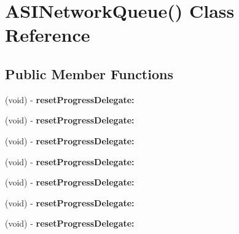 \hypertarget{interface_a_s_i_network_queue_07_08}{
\section{\-A\-S\-I\-Network\-Queue() \-Class \-Reference}
\label{interface_a_s_i_network_queue_07_08}
}
\subsection*{\-Public \-Member \-Functions}
\begin{DoxyCompactItemize}
\item 
\hypertarget{interface_a_s_i_network_queue_07_08_a44ecca8cbb719f930f52221d917bfbaf}{
(void) -\/ {\bfseries reset\-Progress\-Delegate\-:}}
\label{interface_a_s_i_network_queue_07_08_a44ecca8cbb719f930f52221d917bfbaf}

\item 
\hypertarget{interface_a_s_i_network_queue_07_08_a44ecca8cbb719f930f52221d917bfbaf}{
(void) -\/ {\bfseries reset\-Progress\-Delegate\-:}}
\label{interface_a_s_i_network_queue_07_08_a44ecca8cbb719f930f52221d917bfbaf}

\item 
\hypertarget{interface_a_s_i_network_queue_07_08_a44ecca8cbb719f930f52221d917bfbaf}{
(void) -\/ {\bfseries reset\-Progress\-Delegate\-:}}
\label{interface_a_s_i_network_queue_07_08_a44ecca8cbb719f930f52221d917bfbaf}

\item 
\hypertarget{interface_a_s_i_network_queue_07_08_a44ecca8cbb719f930f52221d917bfbaf}{
(void) -\/ {\bfseries reset\-Progress\-Delegate\-:}}
\label{interface_a_s_i_network_queue_07_08_a44ecca8cbb719f930f52221d917bfbaf}

\item 
\hypertarget{interface_a_s_i_network_queue_07_08_a44ecca8cbb719f930f52221d917bfbaf}{
(void) -\/ {\bfseries reset\-Progress\-Delegate\-:}}
\label{interface_a_s_i_network_queue_07_08_a44ecca8cbb719f930f52221d917bfbaf}

\item 
\hypertarget{interface_a_s_i_network_queue_07_08_a44ecca8cbb719f930f52221d917bfbaf}{
(void) -\/ {\bfseries reset\-Progress\-Delegate\-:}}
\label{interface_a_s_i_network_queue_07_08_a44ecca8cbb719f930f52221d917bfbaf}

\item 
\hypertarget{interface_a_s_i_network_queue_07_08_a44ecca8cbb719f930f52221d917bfbaf}{
(void) -\/ {\bfseries reset\-Progress\-Delegate\-:}}
\label{interface_a_s_i_network_queue_07_08_a44ecca8cbb719f930f52221d917bfbaf}


\end{DoxyCompactItemize}
